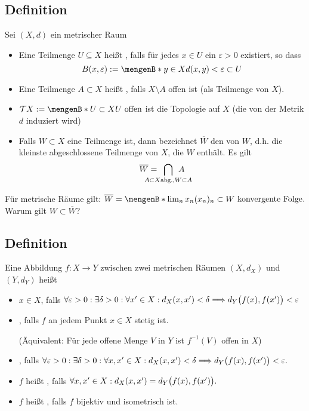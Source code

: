 \subsection[Definition: Offen, abgeschlossen und Abschluss]{Definition} %
\label{sub:12}
Sei $(X,d)$ ein metrischer Raum
\begin{itemize}
	\item Eine Teilmenge $U \subseteq X$ heißt , falls für jedes $x \in U$ ein $\varepsilon > 0$ existiert, so dass 
	\[
		B(x,\varepsilon) := \set[y \in X]{d(x,y) < \varepsilon} \subset U 
	\]
	\item Eine Teilmenge $A \subset X$ heißt , falls $X \setminus A$ offen ist (als Teilmenge von $X$). 
	\item $\mathcal{T}X := \set[U \subset X]{U \text{ offen}} $ ist die Topologie auf $X$ (die von der Metrik $d$ induziert wird)
	\item Falls $W \subset X$ eine Teilmenge ist, dann bezeichnet $\overline{W}$ den  von $W$, d.h. die kleinste abgeschlossene Teilmenge von $X$, die 
	$W$ enthält. Es gilt
	\[
		\overline{W} = \enspace\bigcap_{\mathclap{A \subset X \text{abg.}, W \subset A}} \enspace A 
	\] 
\end{itemize}
Für metrische Räume gilt:
\(
	\overline{W} = \set[\lim_n x_n]{(x_n)_n \subset W \text{ konvergente Folge}}.
\)
Warum gilt $W \subset \overline{W}$?

\subsection[Definition: Stetigkeit, gleichmäßige Stetigkeit, Isometrie]{Definition} %
\label{sub:13}
Eine Abbildung $f : X \to Y$ zwischen zwei metrischen Räumen $(X,d_X)$ und $(Y,d_Y)$ heißt 
\begin{itemize}
	\item {} $x \in X$, falls
	\(
		\forall \varepsilon >0 : \exists \delta >0 : \forall x' \in X : d_X(x,x') < \delta  \Longrightarrow d_Y \enbrace[\big]{f(x), f(x')} < \varepsilon 
	\)
	\item {}, falls $f$ an jedem Punkt $x \in X$ stetig ist.
	
	(Äquivalent: Für jede offene Menge $V$ in $Y$ ist $f ^{-1}(V)$ offen in $X$) 
	\item {}, falls
	\(
		\forall \varepsilon>0 : \exists \delta >0 : \forall x,x' \in X : d_X(x,x') < \delta \Longrightarrow d_Y \enbrace[\big]{f(x), f(x')} < \varepsilon .
	\) 
	\item $f$ heißt , falls 
	\(
		\forall x,x' \in X : d_X(x,x') = d_Y \enbrace[\big]{f(x), f(x')}.
	\)
	\item $f$ heißt , falls $f$ bijektiv und isometrisch ist. 
\end{itemize}

